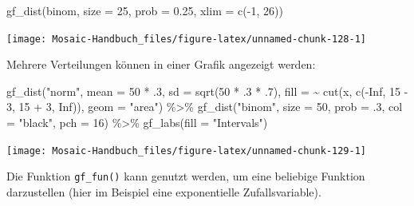 \documentclass[
  ngerman,
]{scrbook}
\newenvironment{Shaded}{\begin{snugshade}}{\end{snugshade}}
\newcommand{\AttributeTok}[1]{\textcolor[rgb]{0.77,0.63,0.00}{#1}}
\newcommand{\ConstantTok}[1]{\textcolor[rgb]{0.00,0.00,0.00}{#1}}
\newcommand{\DecValTok}[1]{\textcolor[rgb]{0.00,0.00,0.81}{#1}}
\newcommand{\FloatTok}[1]{\textcolor[rgb]{0.00,0.00,0.81}{#1}}
\newcommand{\FunctionTok}[1]{\textcolor[rgb]{0.00,0.00,0.00}{#1}}
\newcommand{\NormalTok}[1]{#1}
\newcommand{\SpecialCharTok}[1]{\textcolor[rgb]{0.00,0.00,0.00}{#1}}
\newcommand{\StringTok}[1]{\textcolor[rgb]{0.31,0.60,0.02}{#1}}
\begin{document}
\begin{Shaded}
\begin{Highlighting}[]
\FunctionTok{gf\_dist}\NormalTok{(}\StringTok{\textquotesingle{}binom\textquotesingle{}}\NormalTok{, }\AttributeTok{size =} \DecValTok{25}\NormalTok{, }\AttributeTok{prob =} \FloatTok{0.25}\NormalTok{, }\AttributeTok{xlim =} \FunctionTok{c}\NormalTok{(}\SpecialCharTok{{-}}\DecValTok{1}\NormalTok{, }\DecValTok{26}\NormalTok{))}
\end{Highlighting}
\end{Shaded}

\begin{center}\texttt{[image: Mosaic-Handbuch\_files/figure-latex/unnamed-chunk-128-1]} \end{center}

Mehrere Verteilungen können in einer Grafik angezeigt werden:

\begin{Shaded}
\begin{Highlighting}[]
\FunctionTok{gf\_dist}\NormalTok{(}\StringTok{"norm"}\NormalTok{, }\AttributeTok{mean =} \DecValTok{50} \SpecialCharTok{*}\NormalTok{ .}\DecValTok{3}\NormalTok{, }\AttributeTok{sd =} \FunctionTok{sqrt}\NormalTok{(}\DecValTok{50} \SpecialCharTok{*}\NormalTok{ .}\DecValTok{3} \SpecialCharTok{*}\NormalTok{ .}\DecValTok{7}\NormalTok{), }
        \AttributeTok{fill =} \SpecialCharTok{\textasciitilde{}} \FunctionTok{cut}\NormalTok{(x, }\FunctionTok{c}\NormalTok{(}\SpecialCharTok{{-}}\ConstantTok{Inf}\NormalTok{, }\DecValTok{15} \SpecialCharTok{{-}} \DecValTok{3}\NormalTok{, }\DecValTok{15} \SpecialCharTok{+} \DecValTok{3}\NormalTok{, }\ConstantTok{Inf}\NormalTok{)), }\AttributeTok{geom =} \StringTok{"area"}\NormalTok{) }\SpecialCharTok{\%\textgreater{}\%}
  \FunctionTok{gf\_dist}\NormalTok{(}\StringTok{"binom"}\NormalTok{, }\AttributeTok{size =} \DecValTok{50}\NormalTok{, }\AttributeTok{prob =}\NormalTok{ .}\DecValTok{3}\NormalTok{, }\AttributeTok{col =} \StringTok{"black"}\NormalTok{, }\AttributeTok{pch =} \DecValTok{16}\NormalTok{) }\SpecialCharTok{\%\textgreater{}\%}
  \FunctionTok{gf\_labs}\NormalTok{(}\AttributeTok{fill =} \StringTok{"Intervals"}\NormalTok{)}
\end{Highlighting}
\end{Shaded}

\begin{center}\texttt{[image: Mosaic-Handbuch\_files/figure-latex/unnamed-chunk-129-1]} \end{center}

Die Funktion \texttt{gf\_fun()} kann genutzt werden, um eine beliebige Funktion darzustellen (hier im Beispiel eine exponentielle Zufallsvariable).
\end{document}

